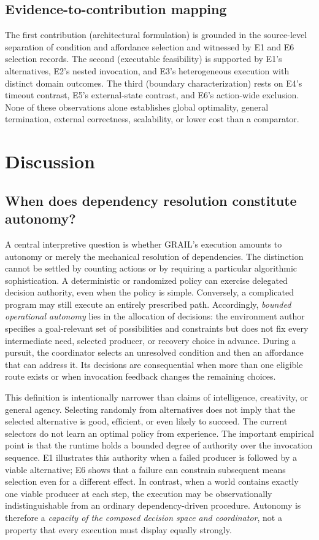 \documentclass[11pt]{article}
\begin{document}
\subsection{Evidence-to-contribution mapping}
The first contribution (architectural formulation) is grounded in the source-level separation of condition and affordance selection and witnessed by E1 and E6 selection records. The second (executable feasibility) is supported by E1's alternatives, E2's nested invocation, and E3's heterogeneous execution with distinct domain outcomes. The third (boundary characterization) rests on E4's timeout contrast, E5's external-state contrast, and E6's action-wide exclusion. None of these observations alone establishes global optimality, general termination, external correctness, scalability, or lower cost than a comparator.

\section{Discussion}
\subsection{When does dependency resolution constitute autonomy?}
A central interpretive question is whether GRAIL's execution amounts to autonomy or merely the mechanical resolution of dependencies. The distinction cannot be settled by counting actions or by requiring a particular algorithmic sophistication. A deterministic or randomized policy can exercise delegated decision authority, even when the policy is simple. Conversely, a complicated program may still execute an entirely prescribed path. Accordingly, \emph{bounded operational autonomy} lies in the allocation of decisions: the environment author specifies a goal-relevant set of possibilities and constraints but does not fix every intermediate need, selected producer, or recovery choice in advance. During a pursuit, the coordinator selects an unresolved condition and then an affordance that can address it. Its decisions are consequential when more than one eligible route exists or when invocation feedback changes the remaining choices.

This definition is intentionally narrower than claims of intelligence, creativity, or general agency. Selecting randomly from alternatives does not imply that the selected alternative is good, efficient, or even likely to succeed. The current selectors do not learn an optimal policy from experience. The important empirical point is that the runtime holds a bounded degree of authority over the invocation sequence. E1 illustrates this authority when a failed producer is followed by a viable alternative; E6 shows that a failure can constrain subsequent means selection even for a different effect. In contrast, when a world contains exactly one viable producer at each step, the execution may be observationally indistinguishable from an ordinary dependency-driven procedure. Autonomy is therefore a \emph{capacity of the composed decision space and coordinator}, not a property that every execution must display equally strongly.
\end{document}
